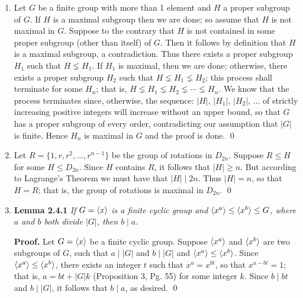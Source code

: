 \begin{enumerate}
      \begin{enumerate}
         \item Let $G$ be a finite group with more than 1 element and $H$ a 
               proper subgroup of $G$. If $H$ is a maximal subgroup then we are
               done; so assume that $H$ is not maximal in $G$. Suppose to the
               contrary that $H$ is not contained in some proper subgroup (other
               than itself) of $G$. Then it follows by definition that $H$ is a
               maximal subgroup, a contradiction. Thus there exists a proper
               subgroup $H_1$ such that $H \lneq H_1$. If $H_1$ is maximal, then
               we are done; otherwise, there exists a proper subgroup $H_2$
               such that $H \lneq H_1 \lneq H_2$; this process shall terminate
               for some $H_n$; that is,
               $H \lneq H_1 \lneq H_2 \lneq \cdots \lneq H_n$. We know that the
               process terminates since, otherwise, the sequence:
               $|H|$, $|H_1|$, $|H_2|$, $\ldots$ of strictly increasing positive 
               integers will increase without an upper bound, so that $G$ has a 
               proper subgroup of every order, contradicting our assumption that 
               $|G|$ is finite.
               Hence $H_n$ is maximal in $G$ and the proof is done. \qed
         \item Let $R = \{1, r, r^2, \ldots, r^{n-1}\}$ be the group of
               rotations in $D_{2n}$. Suppose $R \le H$ for some $H \le D_{2n}$.
               Since $H$ contains $R$, it follows that $|H| \ge n$. But
               according to Lagrange's Theorem we must have that $|H| \mid 2n$.
               Thus $|H| = n$, so that $H = R$; that is, the group of rotations
               is maximal in $D_{2n}$. \qed
         \item \textbf{Lemma 2.4.1} \textit{If $G = \langle x \rangle$ is a finite cyclic 
               group and $\langle x^a \rangle \le \langle x^b \rangle \le G$, where $a$ and $b$ both 
               divide $|G|$, then $b \mid a$}.

               \textbf{Proof.} Let $G = \langle x \rangle$ be a finite cyclic group.
               Suppose $\langle x^a \rangle$ and $\langle x^b \rangle$ are two subgroups of $G$,
               such that $a \mid |G|$ and $b \mid |G|$ and
               $\langle x^a \rangle \le \langle x^b \rangle$. Since $\langle x^a \rangle \le \langle x^b \rangle$, there
               exists an integer $t$ such that $x^a = x^{bt}$, so that
               $x^{a-bt} = 1$; that is, $a = bt + |G|k$ (Proposition 3, Pg. 55) 
               for some integer $k$. Since $b \mid bt$ and $b \mid |G|$, it
               follows that $b \mid a$, as desired. \qed


\end{enumerate}
\end{enumerate}
